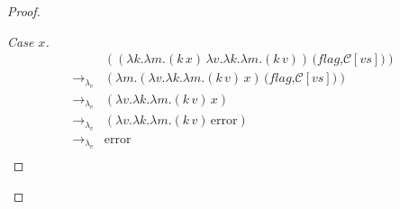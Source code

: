 \documentclass[ms,electronic,twosidetoc,letterpaper,chaptercenter,parttop]{byumsphd}
\begin{document}
\begin{proof}
\begin{proof}[Case $x$]
\begin{align*}
                        &((\lambda k.\lambda m.(k\,x)\,\lambda v.\lambda k.\lambda m.(k\,v))\,\textbf{(}\textit{flag}\textbf{,}\mathcal{C}[vs]\textbf{)})\\
\rightarrow_{\lambda_v} &(\lambda m.(\lambda v.\lambda k.\lambda m.(k\,v)\,x)\,\textbf{(}\textit{flag}\textbf{,}\mathcal{C}[vs]\textbf{)})\\
\rightarrow_{\lambda_v} &(\lambda v.\lambda k.\lambda m.(k\,v)\,x)\\
\rightarrow_{\lambda_v} &(\lambda v.\lambda k.\lambda m.(k\,v)\,\mathrm{error})\\
\rightarrow_{\lambda_v} &\mathrm{error}\\
\end{align*}
\end{proof}

\end{proof}
\end{document}
